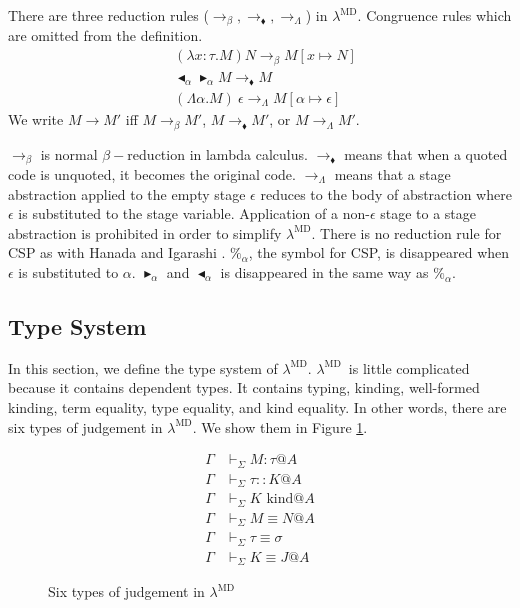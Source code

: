 \documentclass[runningheads]{llncs}
\newcommand{\LMD}{$\lambda^{\textrm{MD}}$\xspace}
\newcommand{\G}{\Gamma}
\newcommand{\V}{\vdash_\Sigma}
\newcommand{\iskind}{\text{\ kind}}
\newcommand{\TB}{\blacktriangleright}
\newcommand{\TBL}{\blacktriangleleft}
\newcommand{\E}{\equiv}
\begin{document}
\begin{definition}[Reduction]
	There are three reduction rules ($\longrightarrow_\beta, \longrightarrow_\blacklozenge, \longrightarrow_\Lambda$) in \LMD.
	Congruence rules which are omitted from the definition.
	\begin{align*}
		 & (\lambda x:\tau.M) N \longrightarrow_\beta M[x \mapsto N]                       \\
		 & \TBL_\alpha \TB_\alpha M \longrightarrow_\blacklozenge M                        \\
		 & (\Lambda \alpha.M)\ \epsilon \longrightarrow_\Lambda M[\alpha \mapsto \epsilon]
	\end{align*}
	We write $ M \longrightarrow M'$ iff $ M \longrightarrow_\beta M'$, $ M \longrightarrow_\blacklozenge M'$, or $ M \longrightarrow_\Lambda M'$.
\end{definition}

$\longrightarrow_\beta$ is normal $\beta-$reduction in lambda calculus.
$\longrightarrow_\blacklozenge$ means that when a quoted code is unquoted, it becomes the original code.
$\longrightarrow_\Lambda$ means that a stage abstraction applied to the empty stage $\epsilon$ reduces to the body of abstraction
where $\epsilon$ is substituted to the stage variable.
Application of a non-$\epsilon$ stage to a stage abstraction is prohibited in order to simplify \LMD.
There is no reduction rule for CSP as with Hanada and Igarashi \cite{Hanada2014}.
$\%_\alpha$, the symbol for CSP, is disappeared when $\epsilon$ is substituted to $\alpha$.
$\TB_\alpha$ and $\TBL_\alpha$ is disappeared in the same way as $\%_\alpha$.

\subsection{Type System}


In this section, we define the type system of \LMD.
\LMD\ is little complicated because it contains dependent types.
It contains typing, kinding, well-formed kinding, term equality, type equality, and kind equality.
In other words, there are six types of judgement in \LMD.
We show them in Figure \ref{fig:LMD-six-judgements}.

\begin{figure}
	\begin{center}
		\begin{align*}
			\G & \V M : \tau @ A   \\
			\G & \V \tau :: K @ A  \\
			\G & \V K \iskind @ A  \\
			\G & \V M \E N @ A     \\
			\G & \V \tau \E \sigma \\
			\G & \V K \E J @ A
		\end{align*}
		\caption{Six types of judgement in \LMD}
		\label{fig:LMD-six-judgements}
	\end{center}
\end{figure}
\end{document}
